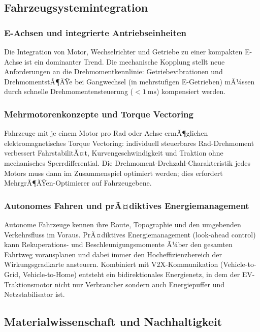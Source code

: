 ﻿\documentclass[a4paper,12pt]{article}
\theoremstyle{definition}
\begin{document}
\subsection{Fahrzeugsystemintegration}

\subsubsection{E-Achsen und integrierte Antriebseinheiten}

Die Integration von Motor, Wechselrichter und Getriebe zu einer kompakten
E-Achse ist ein dominanter Trend. Die mechanische Kopplung stellt neue
Anforderungen an die Drehmomentkennlinie: Getriebevibrationen und
DrehmomentstÃ¶ÃŸe bei Gangwechsel (in mehrstufigen E-Getrieben) mÃ¼ssen durch
schnelle Drehmomentensteuerung ($<\SI{1}{\milli\second}$) kompensiert werden.

\subsubsection{Mehrmotorenkonzepte und Torque Vectoring}

Fahrzeuge mit je einem Motor pro Rad oder Achse ermÃ¶glichen elektromagnetisches
Torque Vectoring: individuell steuerbares Rad-Drehmoment verbessert
FahrstabilitÃ¤t, Kurvengeschwindigkeit und Traktion ohne mechanisches
Sperrdifferential. Die Drehmoment-Drehzahl-Charakteristik jedes Motors muss
dann im Zusammenspiel optimiert werden; dies erfordert MehrgrÃ¶ÃŸen-Optimierer
auf Fahrzeugebene.

\subsubsection{Autonomes Fahren und prÃ¤diktives Energiemanagement}

Autonome Fahrzeuge kennen ihre Route, Topographie und den umgebenden
Verkehrsfluss im Voraus. PrÃ¤diktives Energiemanagement (look-ahead control)
kann Rekuperations- und Beschleunigungsmomente Ã¼ber den gesamten Fahrtweg
vorausplanen und dabei immer den Hocheffizienzbereich der Wirkungsgradkarte
ansteuern. Kombiniert mit V2X-Kommunikation (Vehicle-to-Grid, Vehicle-to-Home)
entsteht ein bidirektionales Energienetz, in dem der EV-Traktionsmotor nicht
nur Verbraucher sondern auch Energiepuffer und Netzstabilisator ist.

\subsection{Materialwissenschaft und Nachhaltigkeit}
\end{document}
